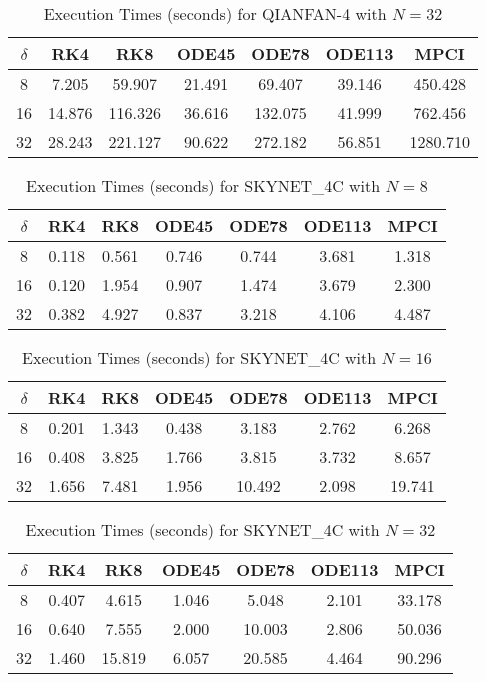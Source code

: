\begin{table}[htbp]
\centering
\begin{tabular}{|c|c|c|c|c|c|c|}
\hline
$\delta$ & RK4 & RK8 & ODE45 & ODE78 & ODE113 & MPCI \\
\hline
8 & 7.205 & 59.907 & 21.491 & 69.407 & 39.146 & 450.428 \\
\hline
16 & 14.876 & 116.326 & 36.616 & 132.075 & 41.999 & 762.456 \\
\hline
32 & 28.243 & 221.127 & 90.622 & 272.182 & 56.851 & 1280.710 \\
\hline
\end{tabular}
\caption{Execution Times (seconds) for QIANFAN-4 with $N=32$}
\label{tab:qianfan_4_N32}
\end{table}

\begin{table}[htbp]
\centering
\begin{tabular}{|c|c|c|c|c|c|c|}
\hline
$\delta$ & RK4 & RK8 & ODE45 & ODE78 & ODE113 & MPCI \\
\hline
8 & 0.118 & 0.561 & 0.746 & 0.744 & 3.681 & 1.318 \\
\hline
16 & 0.120 & 1.954 & 0.907 & 1.474 & 3.679 & 2.300 \\
\hline
32 & 0.382 & 4.927 & 0.837 & 3.218 & 4.106 & 4.487 \\
\hline
\end{tabular}
\caption{Execution Times (seconds) for SKYNET\_4C with $N=8$}
\label{tab:skynet_4c_N8}
\end{table}

\begin{table}[htbp]
\centering
\begin{tabular}{|c|c|c|c|c|c|c|}
\hline
$\delta$ & RK4 & RK8 & ODE45 & ODE78 & ODE113 & MPCI \\
\hline
8 & 0.201 & 1.343 & 0.438 & 3.183 & 2.762 & 6.268 \\
\hline
16 & 0.408 & 3.825 & 1.766 & 3.815 & 3.732 & 8.657 \\
\hline
32 & 1.656 & 7.481 & 1.956 & 10.492 & 2.098 & 19.741 \\
\hline
\end{tabular}
\caption{Execution Times (seconds) for SKYNET\_4C with $N=16$}
\label{tab:skynet_4c_N16}
\end{table}

\begin{table}[htbp]
\centering
\begin{tabular}{|c|c|c|c|c|c|c|}
\hline
$\delta$ & RK4 & RK8 & ODE45 & ODE78 & ODE113 & MPCI \\
\hline
8 & 0.407 & 4.615 & 1.046 & 5.048 & 2.101 & 33.178 \\
\hline
16 & 0.640 & 7.555 & 2.000 & 10.003 & 2.806 & 50.036 \\
\hline
32 & 1.460 & 15.819 & 6.057 & 20.585 & 4.464 & 90.296 \\
\hline
\end{tabular}
\caption{Execution Times (seconds) for SKYNET\_4C with $N=32$}
\label{tab:skynet_4c_N32}
\end{table}

